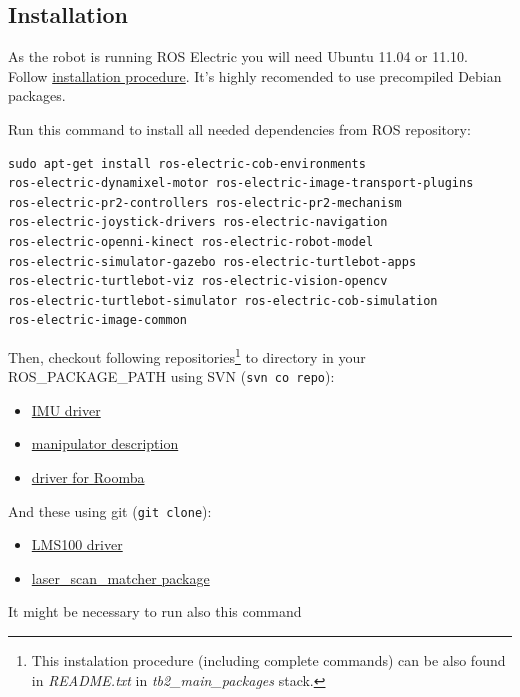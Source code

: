 \documentclass[12pt,a4paper,titlepage]{article}
\numberwithin{equation}{subsection}
\begin{document}
\subsection{Installation}

As the robot is running ROS Electric you will need Ubuntu 11.04 or 11.10. Follow \href{http://www.ros.org/wiki/electric/Installation/Ubuntu}{installation procedure}. It's highly recomended to use precompiled Debian packages.

Run this command to install all needed dependencies from ROS repository:

\begin{verbatim}
sudo apt-get install ros-electric-cob-environments
ros-electric-dynamixel-motor ros-electric-image-transport-plugins
ros-electric-pr2-controllers ros-electric-pr2-mechanism
ros-electric-joystick-drivers ros-electric-navigation
ros-electric-openni-kinect ros-electric-robot-model
ros-electric-simulator-gazebo ros-electric-turtlebot-apps
ros-electric-turtlebot-viz ros-electric-vision-opencv
ros-electric-turtlebot-simulator ros-electric-cob-simulation
ros-electric-image-common
\end{verbatim}

Then, checkout following repositories\footnote{This instalation procedure (including complete commands) can be also found in \emph{README.txt} in \emph{tb2\_main\_packages} stack.} to directory in your ROS\_PACKAGE\_PATH using SVN (\verb|svn co repo|):

\begin{itemize}
  \item{\href{http://aptima-ros-pkg.googlecode.com/svn/trunk/imu_um6}{IMU driver}}
  \item{\href{http://ua-ros-pkg.googlecode.com/svn/trunk/arrg/crustcrawler_smart_arm/}{manipulator description}}
  \item{\href{http://isr-uc-ros-pkg.googlecode.com/svn/stacks/serial_communication/trunk/}{driver for Roomba}}
\end{itemize}

And these using git (\verb|git clone|):

\begin{itemize}
  \item{\href{git://github.com/konradb3/RCPRG-ros-pkg.git}{LMS100 driver}}
  \item{\href{https://github.com/ccny-ros-pkg/scan_tools.git}{laser\_scan\_matcher package}}
\end{itemize}

It might be necessary to run also this command
\end{document}
